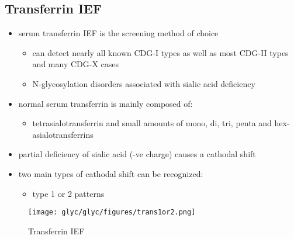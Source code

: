 \documentclass{scrartcl}
\begin{document}
\subsection{Transferrin IEF}
\label{sec:orgb883529}
\begin{itemize}
\item serum transferrin IEF is the screening method of choice
\begin{itemize}
\item can detect nearly all known CDG-I types as well as most CDG-II types and many CDG-X cases
\item N-glycosylation disorders associated with sialic acid deficiency
\end{itemize}
\item normal serum transferrin is mainly composed of:
\begin{itemize}
\item tetrasialotransferrin and small amounts of mono, di, tri, penta
and hex-asialotransferrins
\end{itemize}
\item partial deficiency of sialic acid (-ve charge) causes a
cathodal shift
\item two main types of cathodal shift can be recognized:
\begin{itemize}
\item type 1 or 2 patterns
\end{itemize}
\end{itemize}

\begin{figure}[htbp]
\centering
\texttt{[image: glyc/glyc/figures/trans1or2.png]}
\caption{\label{fig:orga327685}Transferrin IEF}
\end{figure}
\end{document}
